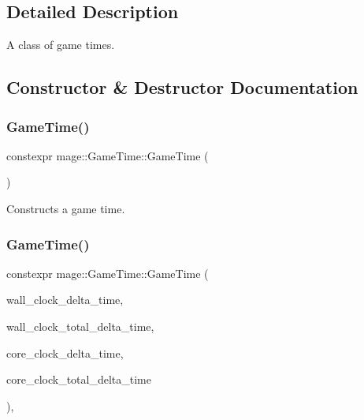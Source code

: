 \subsection{Detailed Description}
A class of game times. 

\subsection{Constructor \& Destructor Documentation}
\mbox{\label{classmage_1_1_game_time_af39a4fbd42467249874ba9372f463552}} 
\subsubsection{\texorpdfstring{Game\+Time()}{GameTime()}\hspace{0.1cm}{\footnotesize\ttfamily [1/4]}}
{\footnotesize\ttfamily constexpr mage\+::\+Game\+Time\+::\+Game\+Time (\begin{DoxyParamCaption}{ }\end{DoxyParamCaption})\hspace{0.3cm}{\ttfamily [noexcept]}}

Constructs a game time. \mbox{\label{classmage_1_1_game_time_a1a5b31bbb76199507b17217099c796d4}} 
\subsubsection{\texorpdfstring{Game\+Time()}{GameTime()}\hspace{0.1cm}{\footnotesize\ttfamily [2/4]}}
{\footnotesize\ttfamily constexpr mage\+::\+Game\+Time\+::\+Game\+Time (\begin{DoxyParamCaption}\item[{\mbox{\hyperlink{namespacemage_a21c3d1575018d1e0720948713c76be1f}{Time\+Interval\+Seconds}}}]{wall\+\_\+clock\+\_\+delta\+\_\+time,  }\item[{\mbox{\hyperlink{namespacemage_a21c3d1575018d1e0720948713c76be1f}{Time\+Interval\+Seconds}}}]{wall\+\_\+clock\+\_\+total\+\_\+delta\+\_\+time,  }\item[{\mbox{\hyperlink{namespacemage_a21c3d1575018d1e0720948713c76be1f}{Time\+Interval\+Seconds}}}]{core\+\_\+clock\+\_\+delta\+\_\+time,  }\item[{\mbox{\hyperlink{namespacemage_a21c3d1575018d1e0720948713c76be1f}{Time\+Interval\+Seconds}}}]{core\+\_\+clock\+\_\+total\+\_\+delta\+\_\+time }\end{DoxyParamCaption})\hspace{0.3cm}{\ttfamily [explicit]}, {\ttfamily [noexcept]}}

